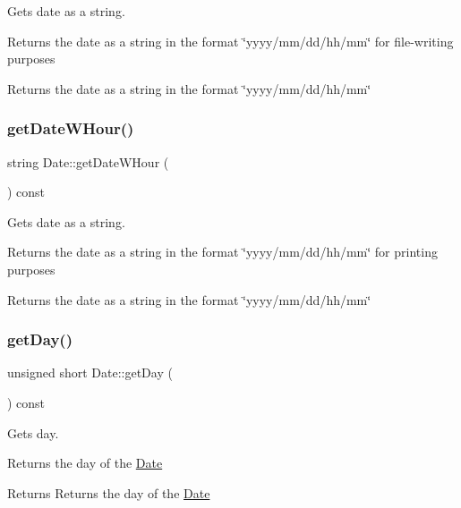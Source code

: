 Gets date as a string. 

Returns the date as a string in the format \char`\"{}yyyy/mm/dd/hh/mm\char`\"{} for file-\/writing purposes

\begin{DoxyReturn}{Returns}
the date as a string in the format \char`\"{}yyyy/mm/dd/hh/mm\char`\"{} 
\end{DoxyReturn}
\mbox{\label{class_date_a1c481aea42a3a310364f9a97661bee14}} 
\subsubsection{\texorpdfstring{get\+Date\+W\+Hour()}{getDateWHour()}}
{\footnotesize\ttfamily string Date\+::get\+Date\+W\+Hour (\begin{DoxyParamCaption}{ }\end{DoxyParamCaption}) const}



Gets date as a string. 

Returns the date as a string in the format \char`\"{}yyyy/mm/dd/hh/mm\char`\"{} for printing purposes

\begin{DoxyReturn}{Returns}
the date as a string in the format \char`\"{}yyyy/mm/dd/hh/mm\char`\"{} 
\end{DoxyReturn}
\mbox{\label{class_date_af02c2f0b61b6e14efbc3ccb0f7f0d567}} 
\subsubsection{\texorpdfstring{get\+Day()}{getDay()}}
{\footnotesize\ttfamily unsigned short Date\+::get\+Day (\begin{DoxyParamCaption}{ }\end{DoxyParamCaption}) const}



Gets day. 

Returns the day of the \hyperlink{class_date}{Date}

\begin{DoxyReturn}{Returns}
Returns the day of the \hyperlink{class_date}{Date} 
\end{DoxyReturn}
\mbox{\label{class_date_a49673a3830aada7b4b55616b5848c843}} 
